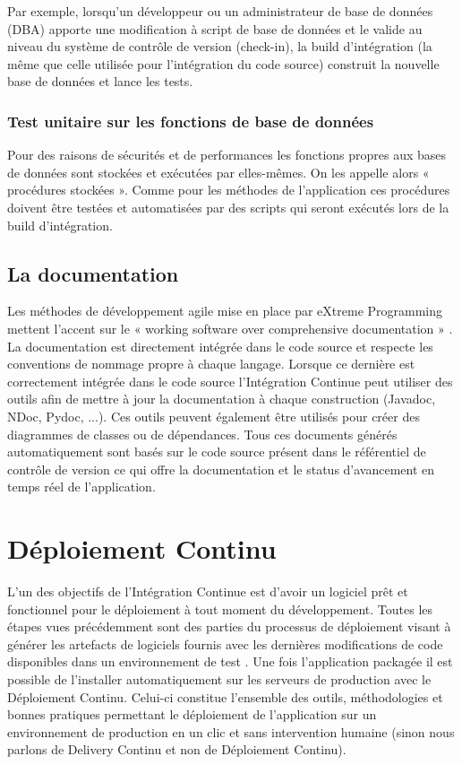     Par exemple, lorsqu’un développeur ou un administrateur de base de données (DBA) apporte une modification à script de base de données et le valide au niveau du système de contrôle de version (check-in), la build d’intégration (la même que celle utilisée pour l’intégration du code source) construit la nouvelle base de données et lance les tests.

      \subsubsection{Test unitaire sur les fonctions de base de données}
      Pour des raisons de sécurités et de performances les fonctions propres aux bases de données sont stockées et exécutées par elles-mêmes. On les appelle alors « procédures stockées ». Comme pour les méthodes de l’application ces procédures doivent être testées et automatisées par des scripts qui seront exécutés lors de la build d’intégration.

    \subsection{La documentation}
    Les méthodes de développement agile mise en place par eXtreme Programming mettent l'accent sur le « working software over comprehensive documentation » \cite{HF01}. La documentation est directement intégrée dans le code source et respecte les conventions de nommage propre à chaque langage. Lorsque ce dernière est correctement intégrée dans le code source l'Intégration Continue peut utiliser des outils afin de mettre à jour la documentation à chaque construction (Javadoc, NDoc, Pydoc, ...). Ces outils peuvent également être utilisés pour créer des diagrammes de classes ou de dépendances. Tous ces documents générés automatiquement sont basés sur le code source présent dans le référentiel de contrôle de version ce qui offre la documentation et le status d'avancement en temps réel de l'application.

  \section{Déploiement Continu}
  L'un des objectifs de l’Intégration Continue est d'avoir un logiciel prêt et fonctionnel pour le déploiement à tout moment du développement. Toutes les étapes vues précédemment sont des parties du processus de déploiement visant à générer les artefacts de logiciels fournis avec les dernières modifications de code disponibles dans un environnement de test \cite{Duv07}. Une fois l’application packagée il est possible de l'installer automatiquement sur les serveurs de production avec le Déploiement Continu. Celui-ci constitue l'ensemble des outils, méthodologies et bonnes pratiques permettant le déploiement de l'application sur un environnement de production en un clic et sans intervention humaine (sinon nous parlons de Delivery Continu et non de Déploiement Continu).

